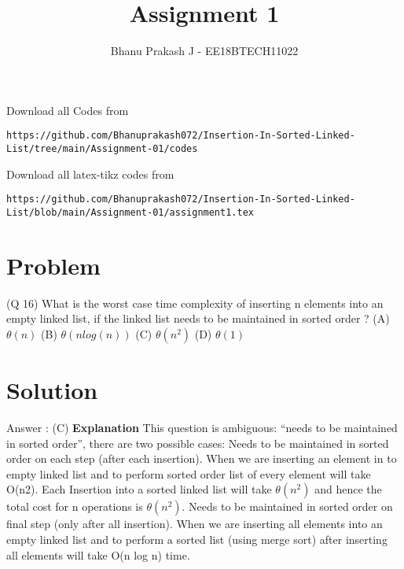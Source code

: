 \documentclass[journal,12pt,twocolumn]{IEEEtran}
\begin{document}
     \def\rightbox#1{\makebox[0in][r]{#1}}
     \def\centbox#1{\makebox[0in]{#1}}
     \def\topbox#1{\raisebox{-\baselineskip}[0in][0in]{#1}}
     \def\midbox#1{\raisebox{-0.5\baselineskip}[0in][0in]{#1}}
\vspace{3cm}
\title{Assignment 1}
\author{Bhanu Prakash J - EE18BTECH11022}
\maketitle
\newpage
\bigskip
\renewcommand{\thefigure}{\theenumi}
\renewcommand{\thetable}{\theenumi}
Download all Codes from 
%
\begin{lstlisting}
https://github.com/Bhanuprakash072/Insertion-In-Sorted-Linked-List/tree/main/Assignment-01/codes
\end{lstlisting}
Download all latex-tikz codes from 
%
\begin{lstlisting}
https://github.com/Bhanuprakash072/Insertion-In-Sorted-Linked-List/blob/main/Assignment-01/assignment1.tex
\end{lstlisting}
\section{Problem}
(Q 16) What is the worst case time complexity of inserting n elements into an empty linked list, if the linked list needs to be maintained in sorted order ?\newline
(A) $\theta(n)$\newline
(B) $\theta(n log(n))$\newline
(C) $\theta(n^2)$\newline
(D) $\theta(1)$\newline

\section{Solution}
Answer : (C)
\newline
\textbf{Explanation}
This question is ambiguous: “needs to be maintained in sorted order”, there are two possible cases:
\newline
\smallskip \hspace{2ex} Needs to be maintained in sorted order on each step (after each insertion).
When we are inserting an element in to empty linked list and to perform sorted order list of every element will take O(n2).
Each Insertion into a sorted linked list will take $\theta(n^2)$ and hence the total cost for n operations is $\theta(n^2)$.
\newline
\smallskip \hspace{2ex}Needs to be maintained in sorted order on final step (only after all insertion).
When we are inserting all elements into an empty linked list and to perform a sorted list (using merge sort) after inserting all elements will take O(n log n) time.
\end{document}
